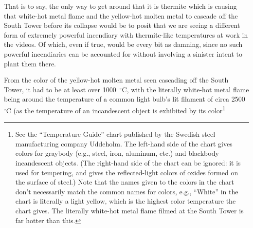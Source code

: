 \documentclass[letterpaper,12pt]{article}
\begin{document}
That is to say, the only way to get around that it is thermite which is causing that white-hot metal flame and the yellow-hot molten metal to cascade off the South Tower before its collapse would be to posit that we are seeing a different form of extremely powerful incendiary with thermite-like temperatures at work in the videos. Of which, even if true, would be every bit as damning, since no such powerful incendiaries can be accounted for without involving a sinister intent to plant them there.

From the color of the yellow-hot molten metal seen cascading off the South Tower, it had to be at least over 1000~\( ^{\circ}\text{C} \), with the literally white-hot metal flame being around the temperature of a common light bulb's lit filament of circa 2500~\( ^{\circ}\text{C} \) (as the temperature of an incandescent object is exhibited by its color\footnote{See the ``Temperature Guide'' \cite{Uddeholm2006} chart published by the Swedish steel-manufacturing company Uddeholm. The left-hand side of the chart gives colors for graybody (e.g., steel, iron, aluminum, etc.) and blackbody incandescent objects. (The right-hand side of the chart can be ignored: it is used for tempering, and gives the reflected-light colors of oxides formed on the surface of steel.) Note that the names given to the colors in the chart don't necessarily match the common names for colors, e.g., ``White'' in the chart is literally a light yellow, which is the highest color temperature the chart gives. The literally white-hot metal flame filmed at the South Tower is far hotter than this.\par
}
\end{document}

